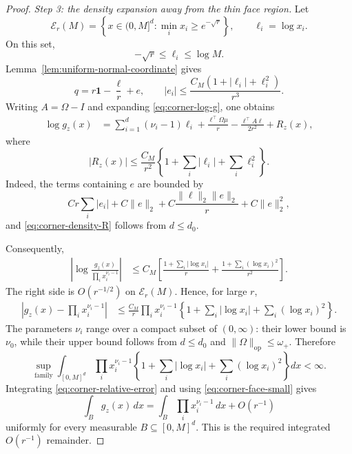 \begin{proof}
\medskip
\noindent
\emph{Step 3: the density expansion away from the thin face
region.}
Let
\[
 \mathcal E_r(M)
 =
 \left\{
  x\in(0,M]^d:\min_i x_i\ge e^{-\sqrt r}
 \right\},
 \qquad
 \ell_i=\log x_i.
\]
On this set,
\[
 -\sqrt r\le\ell_i\le\log M.
\]
Lemma~\ref{lem:uniform-normal-coordinate} gives
\[
 q
 =
 r\mathbf 1-\frac{\ell}{r}+e,
 \qquad
 |e_i|
 \le
 \frac{C_M(1+|\ell_i|+\ell_i^2)}{r^3}.
\]
Writing \(A=\Omega-I\) and expanding
\eqref{eq:corner-log-g}, one obtains
\begin{align}
 \log g_z(x)
 &=
 \sum_{i=1}^d(\nu_i-1)\ell_i
 +\frac{\ell^\top\Omega\mu}{r}
 -\frac{\ell^\top A\ell}{2r^2}
 +R_z(x),
 \label{eq:corner-density-expansion}
\end{align}
where
\begin{equation}
 |R_z(x)|
 \le
 \frac{C_M}{r^2}
 \left\{
  1+\sum_i|\ell_i|+\sum_i\ell_i^2
 \right\}.
 \label{eq:corner-density-R}
\end{equation}
Indeed, the terms containing \(e\) are bounded by
\[
 Cr\sum_i|e_i|
 +C\|e\|_2
 +C\frac{\|\ell\|_2\|e\|_2}{r}
 +C\|e\|_2^2,
\]
and \eqref{eq:corner-density-R} follows from \(d\le d_0\).

Consequently,
\begin{align}
 \left|
 \log\frac{g_z(x)}{\prod_ix_i^{\nu_i-1}}
 \right|
 &\le
 C_M\left[
 \frac{1+\sum_i|\log x_i|}{r}
 +\frac{1+\sum_i(\log x_i)^2}{r^2}
 \right].
 \label{eq:corner-log-relative}
\end{align}
The right side is \(O(r^{-1/2})\) on
\(\mathcal E_r(M)\). Hence, for large \(r\),
\begin{align}
 \left|
 g_z(x)-\prod_ix_i^{\nu_i-1}
 \right|
 &\le
 \frac{C_M}{r}
 \prod_ix_i^{\nu_i-1}
 \left\{
  1+\sum_i|\log x_i|
  +\sum_i(\log x_i)^2
 \right\}.
 \label{eq:corner-relative-error}
\end{align}
The parameters \(\nu_i\) range over a compact subset of
\((0,\infty)\): their lower bound is \(\nu_0\), while their
upper bound follows from \(d\le d_0\) and
\(\|\Omega\|_{\mathrm{op}}\le\omega_+\). Therefore
\[
 \sup_{\text{family}}
 \int_{[0,M]^d}
 \prod_ix_i^{\nu_i-1}
 \left\{
  1+\sum_i|\log x_i|
  +\sum_i(\log x_i)^2
 \right\}dx
 <\infty.
\]
Integrating \eqref{eq:corner-relative-error} and using
\eqref{eq:corner-face-small} gives
\begin{equation}
 \int_Bg_z(x)\,dx
 =
 \int_B\prod_ix_i^{\nu_i-1}\,dx+O(r^{-1})
 \label{eq:corner-integrated-density}
\end{equation}
uniformly for every measurable
\(B\subseteq[0,M]^d\). This is the required integrated
\(O(r^{-1})\) remainder.


\end{proof}
